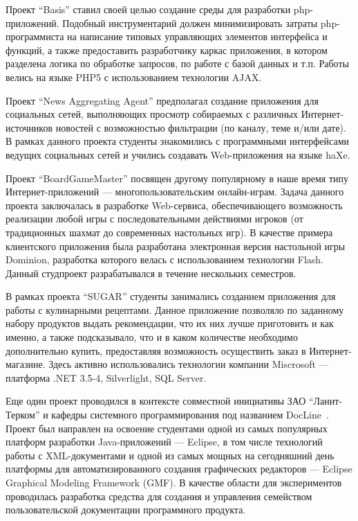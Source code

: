 \documentclass[a4paper]{article}
\begin{document}
Проект ``Basis'' ставил своей целью создание среды для разработки php-приложений. Подобный инструментарий должен минимизировать затраты php-программиста на написание типовых управляющих элементов интерфейса и функций, а также предоставить разработчику каркас приложения, в котором разделена логика по обработке запросов, по работе с базой данных и т.п. Работы велись на языке PHP5 с использованием технологии AJAX.

Проект ``News Aggregating Agent'' предполагал создание приложения для социальных сетей, выполняющих просмотр собираемых с различных Интернет-источников новостей с возможностью фильтрации (по каналу, теме и/или дате). В рамках данного проекта студенты знакомились с программными интерфейсами ведущих социальных сетей и учились создавать Web-приложения на языке haXe.

Проект ``BoardGameMaster'' посвящен другому популярному в наше время типу Интернет-приложений --- многопользовательским онлайн-играм. Задача данного проекта заключалась в разработке Web-сервиса, обеспечивающего возможность реализации любой игры с последовательными действиями игроков (от традиционных шахмат до современных настольных игр). В качестве примера клиентского приложения была разработана электронная версия настольной игры Dominion, разработка которого велась с использованием технологии Flash. Данный студпроект разрабатывался  в течение нескольких семестров.

В рамках проекта ``SUGAR'' студенты занимались созданием приложения для работы с кулинарными рецептами. Данное приложение позволяло по заданному набору продуктов выдать рекомендации, что их них лучше приготовить и как именно, а также подсказывало, что и в каком количестве необходимо дополнительно купить, предоставляя возможность осуществить заказ в Интернет-магазине. Здесь активно использовались технологии компании Miscrosoft --- платформа .NET 3.5-4, Silverlight, SQL Server.

Еще один проект проводился в контексте совместной инициативы ЗАО ``Ланит-Терком'' и кафедры системного программирования под названием DocLine~\cite{docLine1, docLine2, docLine3}. Проект был направлен на освоение студентами одной из самых популярных платформ разработки Java-приложений --- Eclipse, в том числе технологий работы с XML-документами и одной из самых мощных на сегодняшний день платформы для автоматизированного создания графических редакторов --- Eclipse Graphical Modeling Framework (GMF). В качестве области для экспериментов проводилась разработка средства для создания и управления семейством пользовательской документации программного продукта. 
 
\end{document}
